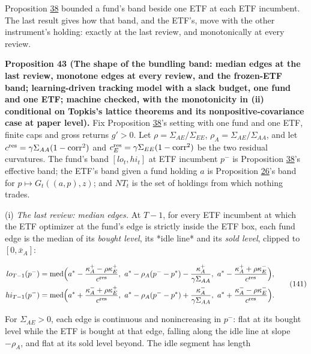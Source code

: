 \documentclass[11pt]{article}
\begin{document}
Proposition \hyperref[res:Proposition-38]{38} bounded a fund's band beside one ETF at each ETF
incumbent. The last result gives how that band, and the ETF's, move
with the other instrument's holding: exactly at the last review, and
monotonically at every review.

\label{res:Proposition-43}
\textbf{Proposition 43 (The shape of the bundling band: median edges at the last review, monotone edges at every review, and the frozen-ETF band; learning-driven tracking model with a slack budget, one fund and one ETF; machine checked, with the monotonicity in (ii) conditional on Topkis's lattice theorems and its nonpositive-covariance case at paper level).}
Fix Proposition \hyperref[res:Proposition-38]{38}'s setting with one fund and one ETF, finite caps
and gross returns \(g'>0\). Let \(\rho=\Sigma_{AE}/\Sigma_{EE}\), \(\rho_A=\Sigma_{AE}/\Sigma_{AA}\), and let
\(c^{\rm res}=\gamma\Sigma_{AA}(1-\mathrm{corr}^2)\) and \(c^{\rm res}_E=\gamma\Sigma_{EE}(1-\mathrm{corr}^2)\) be the two
residual curvatures. The fund's band \([lo_t,hi_t]\) at ETF incumbent \(p^-\) is
Proposition \hyperref[res:Proposition-38]{38}'s effective band; the ETF's band given a fund holding \(a\)
is Proposition \hyperref[res:Proposition-26]{26}'s band for \(p\mapsto G_t((a,p),z)\); and \(NT_t\) is the set of
holdings from which nothing trades.

(i) \emph{The last review: median edges.} At \(T-1\), for every ETF incumbent
at which the ETF optimizer at the fund's edge is strictly inside the
ETF box, each fund edge is the median of its \emph{bought level}, its *idle
line* and its \emph{sold level}, clipped to \([0,\bar x_A]\):

\begin{equation*}
\begin{aligned}
lo_{T-1}(p^-)&=\mathrm{med}\Bigl(a^*-\frac{\kappa^+_A-\rho\kappa^+_E}{c^{\rm res}},\ a^*-\rho_A(p^--p^*)-\frac{\kappa^+_A}{\gamma\Sigma_{AA}},\ a^*-\frac{\kappa^+_A+\rho\kappa^-_E}{c^{\rm res}}\Bigr),\\
hi_{T-1}(p^-)&=\mathrm{med}\Bigl(a^*+\frac{\kappa^-_A+\rho\kappa^+_E}{c^{\rm res}},\ a^*-\rho_A(p^--p^*)+\frac{\kappa^-_A}{\gamma\Sigma_{AA}},\ a^*+\frac{\kappa^-_A-\rho\kappa^-_E}{c^{\rm res}}\Bigr).
\end{aligned}\tag{141}\label{eq:141}
\end{equation*}

For \(\Sigma_{AE}>0\), each edge is continuous and nonincreasing in \(p^-\): flat
at its bought level while the ETF is bought at that edge, falling along
the idle line at slope \(-\rho_A\), and flat at its sold level beyond. The
idle segment has length
\end{document}
